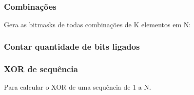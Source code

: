 \subsubsection{Combinações}
Gera as bitmasks de todas combinações de K elementos em N:

\subsubsection{Contar quantidade de bits ligados}

\subsubsection{XOR de sequ\^{e}ncia}
Para calcular o XOR de uma sequ\^{e}ncia de 1 a N.
\divisor
